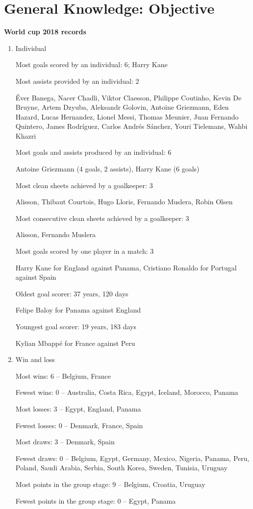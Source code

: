 \section*{General Knowledge: Objective}

\begin{questions}

\textbf{World cup 2018 records}

\begin{enumerate}
\item Individual

Most goals scored by an individual: 6; Harry Kane

Most assists provided by an individual: 2

Éver Banega, Nacer Chadli, Viktor Claesson, Philippe Coutinho, Kevin De Bruyne, Artem Dzyuba, Aleksandr Golovin, Antoine Griezmann, Eden Hazard, Lucas Hernandez, Lionel Messi, Thomas Meunier, Juan Fernando Quintero, James Rodríguez, Carlos Andrés Sánchez, Youri Tielemans, Wahbi Khazri

Most goals and assists produced by an individual: 6

Antoine Griezmann (4 goals, 2 assists), Harry Kane (6 goals)

Most clean sheets achieved by a goalkeeper: 3

Alisson, Thibaut Courtois, Hugo Lloris, Fernando Muslera, Robin Olsen

Most consecutive clean sheets achieved by a goalkeeper: 3

Alisson, Fernando Muslera

Most goals scored by one player in a match: 3

Harry Kane for England against Panama, Cristiano Ronaldo for Portugal against Spain

Oldest goal scorer: 37 years, 120 days

Felipe Baloy for Panama against England

Youngest goal scorer: 19 years, 183 days

Kylian Mbappé for France against Peru

\item Win and loss

Most wins: 6 – Belgium, France

Fewest wins: 0 – Australia, Costa Rica, Egypt, Iceland, Morocco, Panama

Most losses: 3 – Egypt, England, Panama

Fewest losses: 0 – Denmark, France, Spain

Most draws: 3 – Denmark, Spain

Fewest draws: 0 – Belgium, Egypt, Germany, Mexico, Nigeria, Panama, Peru, Poland, Saudi Arabia, Serbia, South Korea, Sweden, Tunisia, Uruguay

Most points in the group stage: 9 – Belgium, Croatia, Uruguay

Fewest points in the group stage: 0 – Egypt, Panama

\end{enumerate}
\end{questions}
